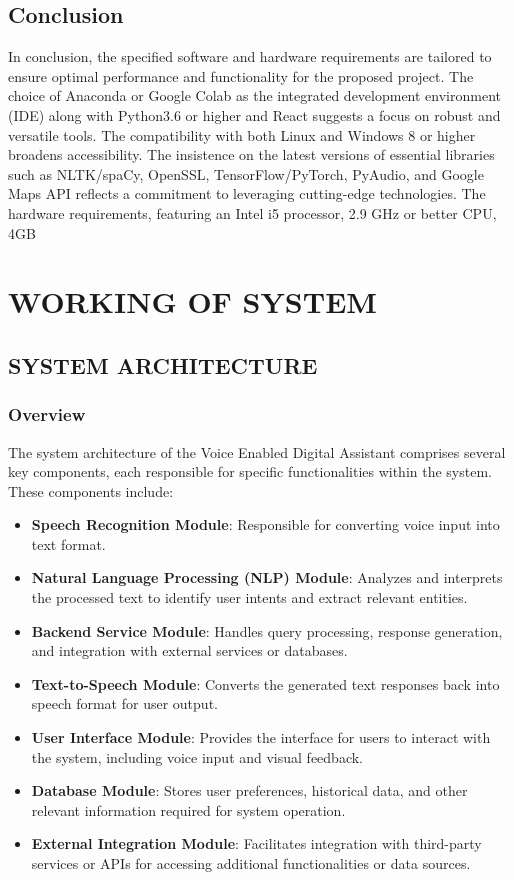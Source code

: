 \documentclass[12pt,a4paper]{report}
\begin{document}
\section{Conclusion}
In conclusion, the specified software and hardware requirements are tailored to ensure optimal performance and functionality for the proposed project. The choice of Anaconda or Google Colab as the integrated development environment (IDE) along with Python3.6 or higher and React suggests a focus on robust and versatile tools. The compatibility with both Linux and Windows 8 or higher broadens accessibility. The insistence on the latest versions of essential libraries such as NLTK/spaCy, OpenSSL, TensorFlow/PyTorch, PyAudio, and Google Maps API reflects a commitment to leveraging cutting-edge technologies. The hardware requirements, featuring an Intel i5 processor, 2.9 GHz or better CPU, 4GB


\newpage
\chapter{WORKING OF SYSTEM}
\section{SYSTEM ARCHITECTURE}
\subsection{Overview}
The system architecture of the Voice Enabled Digital Assistant comprises several key components, each responsible for specific functionalities within the system. These components include:

\begin{itemize}
    \item \textbf{Speech Recognition Module}: Responsible for converting voice input into text format.
    
    \item \textbf{Natural Language Processing (NLP) Module}: Analyzes and interprets the processed text to identify user intents and extract relevant entities.
    
    \item \textbf{Backend Service Module}: Handles query processing, response generation, and integration with external services or databases.
    
    \item \textbf{Text-to-Speech Module}: Converts the generated text responses back into speech format for user output.
    
    \item \textbf{User Interface Module}: Provides the interface for users to interact with the system, including voice input and visual feedback.
    
    \item \textbf{Database Module}: Stores user preferences, historical data, and other relevant information required for system operation.
    
    \item \textbf{External Integration Module}: Facilitates integration with third-party services or APIs for accessing additional functionalities or data sources.
\end{itemize}
\end{document}
